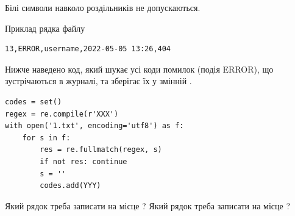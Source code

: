 \documentclass[12pt, ukrainian]{article}
\begin{document}
{Білі символи навколо роздільників не допускаються.

Приклад рядка файлу



\begin{verbatim}
13,ERROR,username,2022-05-05 13:26,404
\end{verbatim}


Нижче наведено код, який шукає усі коди помилок (подія ERROR), що зустріча\-ють\-ся в журналі, та зберігає їх у змінній .



\begin{verbatim}
codes = set()
regex = re.compile(r'XXX')
with open('1.txt', encoding='utf8') as f:
    for s in f:
        res = re.fullmatch(regex, s)
        if not res: continue
        s = ''
        codes.add(YYY)
\end{verbatim}



Який рядок треба записати на місце  ?
Який рядок треба записати на місце  ?\par

}
\newpage
\end{document}
